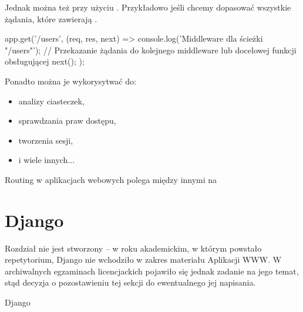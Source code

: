 Jednak można też przy użyciu . Przykładowo jeśli chcemy dopasować wszystkie żądania, które zawierają  .

\begin{example}
\begin{js}    
app.get('/users', (req, res, next) => {
  console.log('Middleware dla ścieżki "/users"');
  // Przekazanie żądania do kolejnego middleware lub docelowej funkcji obsługującej
  next();
});
\end{js}

\end{example}

Ponadto można je wykorysytwać do:

\begin{itemize}
    \item analizy ciasteczek,
    \item sprawdzania praw dostępu,
    \item tworzenia sesji,
    \item i wiele innych...
\end{itemize}


\begin{problems}
    \prob Routing w aplikacjach webowych polega między innymi na
\end{problems}

\section{Django}

\begin{editorsnote}
    Rozdział nie jest stworzony -- w roku akademickim, w którym powstało repetytorium, Django nie wchodziło w zakres materiału Aplikacji WWW. W archiwalnych egzaminach licencjackich pojawiło się jednak zadanie na jego temat, stąd decyzja o pozostawieniu tej sekcji do ewentualnego jej napisania.
\end{editorsnote}

\begin{problems}
    \prob Django
\end{problems}


